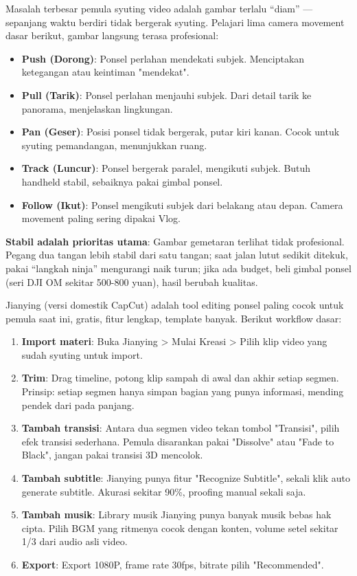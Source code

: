 
Masalah terbesar pemula syuting video adalah gambar terlalu “diam” — sepanjang waktu berdiri tidak bergerak syuting. Pelajari lima camera movement dasar berikut, gambar langsung terasa profesional:

\begin{itemize}
  \item \textbf{Push (Dorong)}: Ponsel perlahan mendekati subjek. Menciptakan ketegangan atau keintiman "mendekat".
  \item \textbf{Pull (Tarik)}: Ponsel perlahan menjauhi subjek. Dari detail tarik ke panorama, menjelaskan lingkungan.
  \item \textbf{Pan (Geser)}: Posisi ponsel tidak bergerak, putar kiri kanan. Cocok untuk syuting pemandangan, menunjukkan ruang.
  \item \textbf{Track (Luncur)}: Ponsel bergerak paralel, mengikuti subjek. Butuh handheld stabil, sebaiknya pakai gimbal ponsel.
  \item \textbf{Follow (Ikut)}: Ponsel mengikuti subjek dari belakang atau depan. Camera movement paling sering dipakai Vlog.
\end{itemize}

\textbf{Stabil adalah prioritas utama}: Gambar gemetaran terlihat tidak profesional. Pegang dua tangan lebih stabil dari satu tangan; saat jalan lutut sedikit ditekuk, pakai “langkah ninja” mengurangi naik turun; jika ada budget, beli gimbal ponsel (seri DJI OM sekitar 500-800 yuan), hasil berubah kualitas.


Jianying (versi domestik CapCut) adalah tool editing ponsel paling cocok untuk pemula saat ini, gratis, fitur lengkap, template banyak. Berikut workflow dasar:

\begin{enumerate}
  \item \textbf{Import materi}: Buka Jianying > Mulai Kreasi > Pilih klip video yang sudah syuting untuk import.
  \item \textbf{Trim}: Drag timeline, potong klip sampah di awal dan akhir setiap segmen. Prinsip: setiap segmen hanya simpan bagian yang punya informasi, mending pendek dari pada panjang.
  \item \textbf{Tambah transisi}: Antara dua segmen video tekan tombol "Transisi", pilih efek transisi sederhana. Pemula disarankan pakai "Dissolve" atau "Fade to Black", jangan pakai transisi 3D mencolok.
  \item \textbf{Tambah subtitle}: Jianying punya fitur "Recognize Subtitle", sekali klik auto generate subtitle. Akurasi sekitar 90\%, proofing manual sekali saja.
  \item \textbf{Tambah musik}: Library musik Jianying punya banyak musik bebas hak cipta. Pilih BGM yang ritmenya cocok dengan konten, volume setel sekitar 1/3 dari audio asli video.
  \item \textbf{Export}: Export 1080P, frame rate 30fps, bitrate pilih "Recommended".
\end{enumerate}

